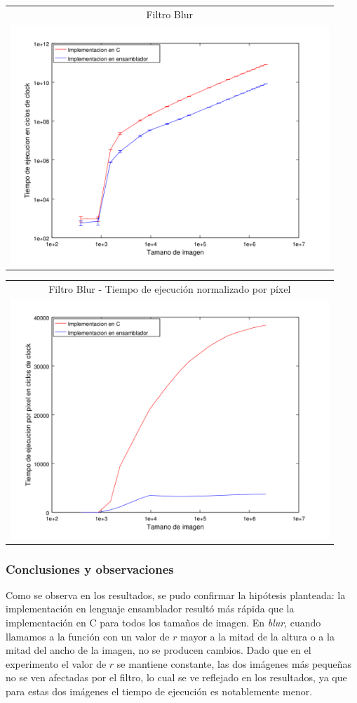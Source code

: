 			{\centering \begin{tabular}{c}
		      {\small Filtro Blur} \\
		      \includegraphics[width=12cm]{../exp/graficos/exp1-blur-c_vs_asm.png} \\
		    \end{tabular}}

		   	{\centering \begin{tabular}{c}
		      {\small Filtro Blur - Tiempo de ejecución normalizado por píxel} \\
		      \includegraphics[width=12cm]{../exp/graficos/exp1-blur-tiempo_por_pixel.png} \\
		    \end{tabular}}

		\subsubsection*{Conclusiones y observaciones} 
			Como se observa en los resultados, se pudo confirmar la hipótesis planteada: la implementación en lenguaje ensamblador resultó más rápida que la implementación en C para todos los tamaños de imagen.
			En \emph{blur}, cuando llamamos a la función con un valor de $r$ mayor a la mitad de la altura o a la mitad del ancho de la imagen, no se producen cambios. Dado que en el experimento el valor de $r$ se mantiene constante, las dos imágenes más pequeñas no se ven afectadas por el filtro, lo cual se ve reflejado en los resultados, ya que para estas dos imágenes el tiempo de ejecución es notablemente menor.

